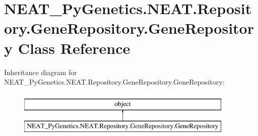 \hypertarget{class_n_e_a_t___py_genetics_1_1_n_e_a_t_1_1_repository_1_1_gene_repository_1_1_gene_repository}{}\section{N\+E\+A\+T\+\_\+\+Py\+Genetics.\+N\+E\+A\+T.\+Repository.\+Gene\+Repository.\+Gene\+Repository Class Reference}
\label{class_n_e_a_t___py_genetics_1_1_n_e_a_t_1_1_repository_1_1_gene_repository_1_1_gene_repository}
Inheritance diagram for N\+E\+A\+T\+\_\+\+Py\+Genetics.\+N\+E\+A\+T.\+Repository.\+Gene\+Repository.\+Gene\+Repository\+:\begin{figure}[H]
\begin{center}
\leavevmode
\includegraphics[height=2.000000cm]{class_n_e_a_t___py_genetics_1_1_n_e_a_t_1_1_repository_1_1_gene_repository_1_1_gene_repository}
\end{center}
\end{figure}
